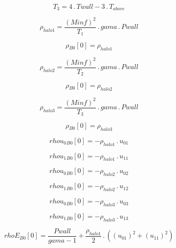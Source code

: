 \documentclass{article}
\begin{document}
\begin{dmath}T_{3} = 4 \,.\, Twall - 3 \,.\, T_{above}\end{dmath}

\begin{dmath}\rho_{halo 1} = \frac{\left(Minf \right)^{2}}{T_{1}} \,.\, gama \,.\, Pwall\end{dmath}

\begin{dmath}{\rho{_{B0}}}[{0}] = \rho_{halo 1}\end{dmath}

\begin{dmath}\rho_{halo 2} = \frac{\left(Minf \right)^{2}}{T_{2}} \,.\, gama \,.\, Pwall\end{dmath}

\begin{dmath}{\rho{_{B0}}}[{0}] = \rho_{halo 2}\end{dmath}

\begin{dmath}\rho_{halo 3} = \frac{\left(Minf \right)^{2}}{T_{3}} \,.\, gama \,.\, Pwall\end{dmath}

\begin{dmath}{\rho{_{B0}}}[{0}] = \rho_{halo 3}\end{dmath}

\begin{dmath}{rhou_{0}{_{B0}}}[{0}] = - \rho_{halo 1} \,.\, u_{01}\end{dmath}

\begin{dmath}{rhou_{1}{_{B0}}}[{0}] = - \rho_{halo 1} \,.\, u_{11}\end{dmath}

\begin{dmath}{rhou_{0}{_{B0}}}[{0}] = - \rho_{halo 2} \,.\, u_{02}\end{dmath}

\begin{dmath}{rhou_{1}{_{B0}}}[{0}] = - \rho_{halo 2} \,.\, u_{12}\end{dmath}

\begin{dmath}{rhou_{0}{_{B0}}}[{0}] = - \rho_{halo 3} \,.\, u_{03}\end{dmath}

\begin{dmath}{rhou_{1}{_{B0}}}[{0}] = - \rho_{halo 3} \,.\, u_{13}\end{dmath}

\begin{dmath}{rhoE{_{B0}}}[{0}] = \frac{Pwall}{gama - 1} + \frac{\rho_{halo 1}}{2} \,.\, \left(\left(u_{01} \right)^{2} + \left(u_{11} \right)^{2}\right)\end{dmath}
\end{document}
